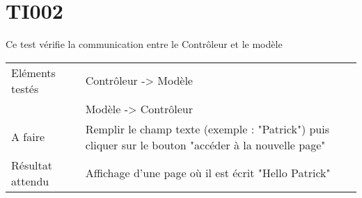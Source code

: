 \section{TI002}
	Ce test vérifie la communication entre le Contrôleur et le modèle
	\begin{center}
     	\begin{tabular}[h]{|p{}|p{}|}
		\hline
			Eléments testés & Contrôleur -> Modèle \\
						    &  Modèle -> Contrôleur \\\hline
    			A faire & Remplir le champ texte (exemple : "Patrick") puis cliquer sur le bouton "accéder à la nouvelle page" \\\hline
    			Résultat attendu & Affichage d'une page où il est écrit "Hello Patrick" \\\hline
     	\end{tabular}
  	\end{center}	